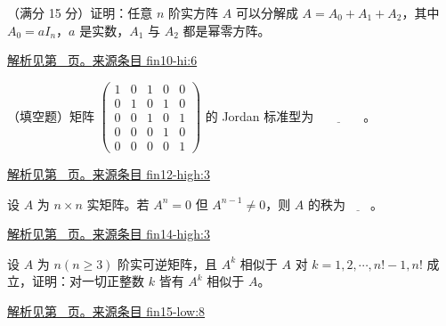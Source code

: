 \documentclass[12pt,fontset=fandol]{ctexart}
\begin{document}
\begin{example}\label{ex:fin10-hi:6}

（满分 15 分）证明：任意 $n$ 阶实方阵 $A$ 可以分解成 $A = A_{0} + A_{1} + A_{2}$，其中 $A_{0} = aI_{n}$，$a$ 是实数，$A_{1}$ 与 $A_{2}$ 都是幂零方阵。

\par\hyperref[ans:fin10-hi:6]{解析见第~\pageref{ans:fin10-hi:6} 页。}\quad\href{https://github.com/lzxcr/cmc-mathematics/blob/64916fa1fdbc3e444a652eca204d5669058ee321/src/problems/finals/10/06.md}{来源条目 fin10-hi:6}

\end{example}

\begin{example}\label{ex:fin12-high:3}

（填空题）矩阵 $\begin{pmatrix} 1 & 0 & 1 & 0 & 0 \\ 0 & 1 & 0 & 1 & 0 \\ 0 & 0 & 1 & 0 & 1 \\ 0 & 0 & 0 & 1 & 0 \\ 0 & 0 & 0 & 0 & 1 \end{pmatrix}$ 的 Jordan 标准型为$\underline{\qquad\qquad}$。

\par\hyperref[ans:fin12-high:3]{解析见第~\pageref{ans:fin12-high:3} 页。}\quad\href{https://github.com/lzxcr/cmc-mathematics/blob/64916fa1fdbc3e444a652eca204d5669058ee321/src/problems/finals/12/03.md}{来源条目 fin12-high:3}

\end{example}

\begin{example}\label{ex:fin14-high:3}

设 $A$ 为 $n \times n$ 实矩阵。若 $A^n=0$ 但 $A^{n-1} \neq 0$，则 $A$ 的秩为$\underline{\qquad}$。

\par\hyperref[ans:fin14-high:3]{解析见第~\pageref{ans:fin14-high:3} 页。}\quad\href{https://github.com/lzxcr/cmc-mathematics/blob/64916fa1fdbc3e444a652eca204d5669058ee321/src/problems/finals/14/03.md}{来源条目 fin14-high:3}

\end{example}

\begin{example}\label{ex:fin15-low:8}

设 $A$ 为 $n(n \geq 3)$ 阶实可逆矩阵，且 $A^{k}$ 相似于 $A$ 对 $k = 1,2,\cdots,n!-1,n!$ 成立，证明：对一切正整数 $k$ 皆有 $A^{k}$ 相似于 $A$。

\par\hyperref[ans:fin15-low:8]{解析见第~\pageref{ans:fin15-low:8} 页。}\quad\href{https://github.com/lzxcr/cmc-mathematics/blob/64916fa1fdbc3e444a652eca204d5669058ee321/src/problems/finals/15/08.md}{来源条目 fin15-low:8}

\end{example}
\end{document}
